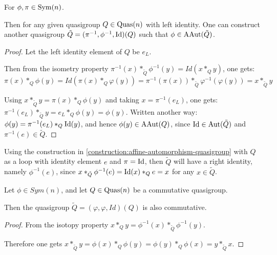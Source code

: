 \begin{construction} \label{construction:affine-automorphism-quasigroup}
    For \( \phi, \pi \in \operatorname{Sym}(n) \).

    Then for any given quasigroup \( Q \in \operatorname{Quas}(n) \) with left identity. One can construct another quasigroup \( \tilde{Q} = (\pi^{-1}, \phi^{-1}, \operatorname{Id})(Q) \) such that \( \phi \in \operatorname{AAut}(\tilde{Q}) \).
\end{construction}
\begin{proof}
    Let the left identity element of \( Q \) be \( e_L \).
    
    Then from the isometry property \( \pi^{-1}(x) *_{\tilde{Q}} \phi^{-1}(y) = Id(x *_Q y) \), one gets: 
    \[
        \pi(x) *_Q \phi(y) = Id(\pi(x) *_Q \varphi(y)) = \pi^{-1}(\pi(x)) *_{\tilde{Q}} \varphi^{-1}(\varphi(y)) = x *_{\tilde{Q}} y 
    \]

    Using \( x *_{\tilde{Q}} y = \pi(x) *_Q \phi(y) \) and taking \( x = \pi^{-1}(e_L) \), one gets: \( \pi^{-1}(e_L) *_{\tilde{Q}} y = e_L *_Q \phi(y) = \phi(y) \). Written another way: \( \phi(y) = \pi^{-1}(e_L) *_Q \operatorname{Id}(y) \), and hence \( \phi(y) \in \operatorname{AAut}(Q) \), since \( \operatorname{Id} \in \operatorname{Aut}(\tilde{Q}) \) and \( \pi^{-1}(e) \in \tilde{Q} \).
\end{proof}

\begin{remark} \label{remark:construction-right-id}
    Using the construction in \autoref{construction:affine-automorphism-quasigroup} with \( Q \) as a loop with identity element \( e \) and \( \pi = \operatorname{Id} \), then \( \tilde{Q} \) will have a right identity, namely \( \phi^{-1}(e) \), since \( x *_{\tilde{Q}} \phi^{-1}(e) = \operatorname{Id}(x) *_Q e = x \) for any \( x \in \tilde{Q} \).
\end{remark}

\begin{lemma} \label{lemma:commutative-quasigroup}
    Let \( \phi \in Sym(n) \), and let \( Q \in \operatorname{Quas}(n) \) be a commutative quasigroup.

    Then the quasigroup \( \tilde{Q} = (\varphi, \varphi, Id)(Q) \) is also commutative.
\end{lemma}
\begin{proof}
    From the isotopy property \( x *_Q y = \phi^{-1}(x) *_{\tilde{Q}} \phi^{-1}(y) \).

    Therefore one gets \( x *_{\tilde{Q}} y = \phi(x) *_Q \phi(y) = \phi(y) *_Q \phi(x) = y *_{\tilde{Q}} x \). 
\end{proof}

